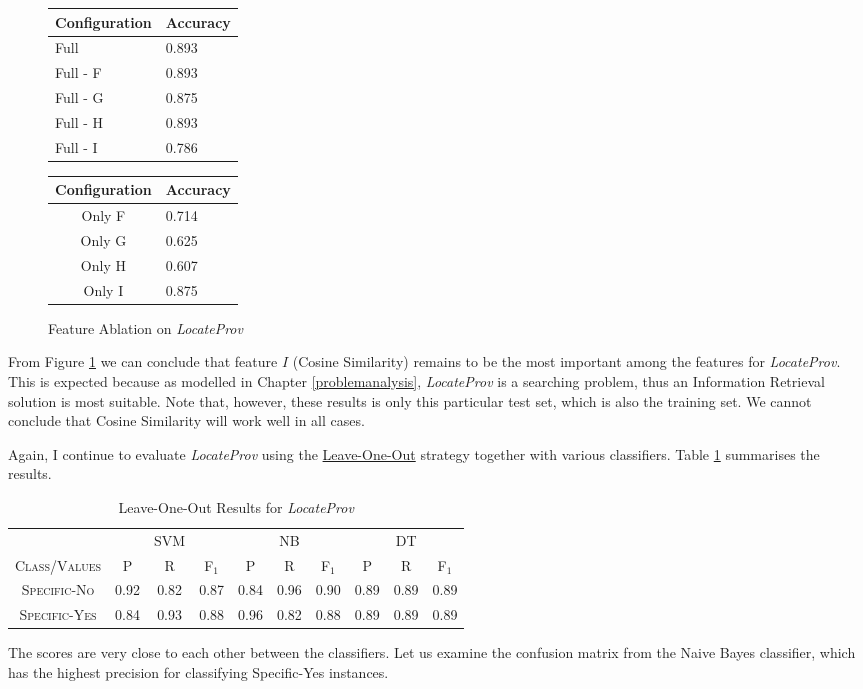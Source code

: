\begin{figure}[ht]
\begin{minipage}[b]{0.45\linewidth}\centering
\begin{tabular}{ l | l }
Configuration & Accuracy \\
\hline
Full		& 0.893 \\
Full - F	& 0.893 \\
Full - G	& 0.875 \\
Full - H	& 0.893 \\
Full - I	& 0.786 \\
\end{tabular}
\end{minipage}
\hspace{0.5cm}
\begin{minipage}[b]{0.45\linewidth}\centering
\begin{tabular}{ c | l }
Configuration & Accuracy \\
\hline
Only F	& 0.714 \\
Only G	& 0.625 \\
Only H	& 0.607 \\
Only I	& 0.875 \\
\end{tabular}
\end{minipage}
\caption{Feature Ablation on {\it LocateProv}}
\label{fig:ablation_second}
\end{figure}
From Figure \ref{fig:ablation_second} we can conclude that feature $I$ (Cosine Similarity) remains to be the most important among the features for {\it LocateProv}. This is expected because as modelled in Chapter \ref{problemanalysis}, {\it LocateProv} is a searching problem, thus an Information Retrieval solution is most suitable. Note that, however, these results is only this particular test set, which is also the training set. We cannot conclude that Cosine Similarity will work well in all cases.

Again, I continue to evaluate {\it LocateProv} using the \url{Leave-One-Out} strategy together with various classifiers. Table \ref{tab:secondtieresults} summarises the results.

\begin{table}[h]
	\center
	\begin{tabular}{ c | c  c  c | c c c | c c c}
		& & SVM & & & NB & & & DT \\
		\textsc{Class/Values} & \textsc{P} & \textsc{R} & \textsc{F$_1$} & \textsc{P} & \textsc{R} & \textsc{F$_1$} & \textsc{P} & \textsc{R} & \textsc{F$_1$} \\
		\hline
		\textsc{Specific-No} 			& 0.92  &    0.82   &   0.87 & 0.84   &   0.96   &   0.90 & 0.89  &    0.89  &    0.89 \\
		\textsc{Specific-Yes} 			& 0.84  &    0.93   &   0.88 & 0.96   &   0.82   &   0.88 & 0.89  &    0.89  &    0.89 \\
	\end{tabular}
	\caption{Leave-One-Out Results for {\it LocateProv}}
	\label{tab:secondtieresults}
\end{table}
The scores are very close to each other between the classifiers. Let us examine the confusion matrix from the Naive Bayes classifier, which has the highest precision for classifying Specific-Yes instances.

